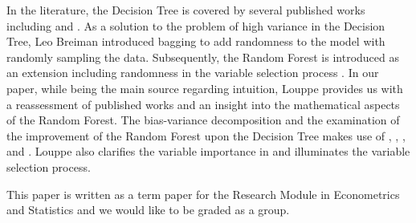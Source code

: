 In the literature, 
the Decision Tree is covered by several published works including 
\cite{breiman1984classification} and \cite{James2013}.
As a solution to the problem of high variance in the Decision Tree, 
Leo Breiman introduced bagging to add randomness to the model 
with randomly sampling the data\cite{breiman1996bagging}. 
Subsequently, the Random Forest is introduced as an extension including
randomness in the variable selection process \cite{breiman2001random}. 
In our paper, while \cite{friedman2001elements} being the main source regarding intuition,
Louppe provides us with a reassessment of published works and an insight into 
the mathematical aspects of the Random Forest\cite{louppe2014understanding}.
The bias-variance decomposition and the examination of 
the improvement of the Random Forest upon the Decision Tree makes use of
\cite{james2003variance}, \cite{domingos2000decomposition}, \cite{friedman1997zeroLoss}, and \cite{kohavi1996bias}. 
Louppe also clarifies the variable importance in \cite{louppe2013understanding} and 
\cite{kohavi1997importance} illuminates the variable selection process.

This paper is written as a term paper for the Research Module in Econometrics and Statistics and 
we would like to be graded as a group.
